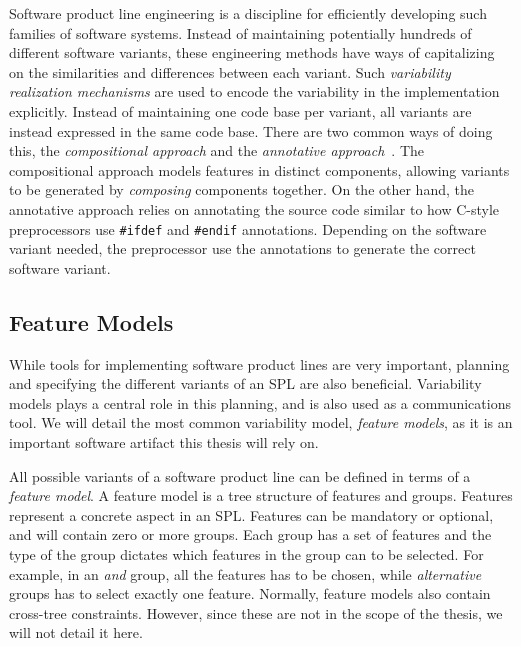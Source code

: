 \documentclass[a4paper,english]{ifimaster}
\begin{document}
Software product line engineering is a discipline for efficiently developing such families of software systems. Instead of maintaining potentially hundreds of different software variants, these engineering methods have ways of capitalizing on the similarities and differences between each variant. Such \textit{variability realization mechanisms} are used to encode the variability in the implementation explicitly. Instead of maintaining one code base per variant, all variants are instead expressed in the same code base. There are two common ways of doing this, the \textit{compositional approach} and the \textit{annotative approach}~\cite{cite:granularity_in_spl}. The compositional approach models features in distinct components, allowing variants to be generated by \textit{composing} components together. On the other hand, the annotative approach relies on annotating the source code similar to how C-style preprocessors use \texttt{\#ifdef} and \texttt{\#endif} annotations. Depending on the software variant needed, the preprocessor use the annotations to generate the correct software variant.

\subsection{Feature Models}%
\label{sub:feature_models}

While tools for implementing software product lines are very important, planning and specifying the different variants of an SPL are also beneficial. Variability models plays a central role in this planning, and is also used as a communications tool. We will detail the most common variability model, \textit{feature models}, as it is an important software artifact this thesis will rely on.

All possible variants of a software product line can be defined in terms of a \textit{feature model}. A feature model is a tree structure of features and groups. Features represent a concrete aspect in an SPL. Features can be mandatory or optional, and will contain zero or more groups. Each group has a set of features and the type of the group dictates which features in the group can to be selected. For example, in an \textit{and} group, all the features has to be chosen, while  \textit{alternative} groups has to select exactly one feature. Normally, feature models also contain cross-tree constraints. However, since these are not in the scope of the thesis, we will not detail it here.
\end{document}
